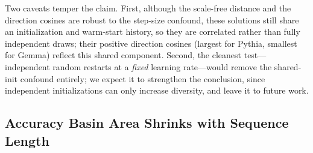 Two caveats temper the claim. First, although the scale-free distance and the direction cosines are
robust to the step-size confound, these solutions still share an initialization and warm-start history, so
they are correlated rather than fully independent draws; their positive direction cosines (largest for
Pythia, smallest for Gemma) reflect this shared component. Second, the cleanest test---independent random restarts at a \emph{fixed} learning
rate---would remove the shared-init confound entirely; we expect it to strengthen the conclusion, since
independent initializations can only increase diversity, and leave it to future work.

\begin{table}[t]
    \centering
    \caption{Equally-good cramming solutions are far apart and point in largely independent directions. Using the
    shared-initialization learning-rate sweep of Table~\ref{tab:all_learning_rates}, we pool over all
    prefix (sample, length) groups that two or more learning rates drive to perfect reconstruction, and
    report: ``$N$'' the number of such groups (over $10$ PG19 samples); ``IG CV'' the coefficient of
    variation of information gain across the learning rates (equal quality $\Rightarrow$ small);
    ``Sol.\ dist.'' the mean cross-solution Euclidean distance in units of the mean
    displacement-from-init (median [IQR]; ${>}1$ means solutions are farther from each other than from
    the shared start); ``Dir.\ cos.'' the mean pairwise cosine of the solutions' displacement vectors,
    each measured from the shared init (random baseline $\approx 1/\sqrt{d}=0.016$--$0.022$); and
    ``Disp.\ ratio'' the mean displacement-from-init
    at the largest learning rate over that at the smallest. Equally-good solutions are far apart and
    point in largely independent directions across every family, indicating a wide, high-dimensional
    valid-solution set.}
    \label{tab:solution_diversity}
    \begin{small}
    
    \end{small}
\vskip -0.1in
\end{table}


\subsection{Accuracy Basin Area Shrinks with Sequence Length}
\label{app:basin_area}

